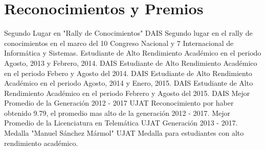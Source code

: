 \documentclass[]{friggeri-cv}
\begin{document}
\section{Reconocimientos y Premios}
\begin{entrylist}
          {Segundo Lugar en "Rally de Conocimientos"}
          {DAIS}
          {Segundo lugar en el rally de conocimientos en el marco del 10 Congreso Nacional y 7 Internacional de Informática y Sistemas.}
          {Estudiante de Alto Rendimiento Académico en el periodo Agosto, 2013 y Febrero, 2014.}
          {DAIS}
          {}
          {Estudiante de Alto Rendimiento Académico en el periodo Febero y Agosto del 2014.}
          {DAIS}
          {}
          {Estudiante de Alto Rendimiento Académico en el periodo Agosto, 2014 y Enero, 2015.}
          {DAIS}
          {}
          {Estudiante de Alto Rendimiento Académico en el periodo Febrero y Agosto del 2015.}
          {DAIS}
          {}
          {Mejor Promedio de la Generación 2012 - 2017}
          {UJAT}
          {Reconocimiento por haber obtenido 9.79, el promedio mas alto de la generación 2012 - 2017.}
          {Mejor Promedio de la Licenciatura en Telemática}
          {UJAT}
          {Generación 2013 - 2017.}
          {Medalla "Manuel Sánchez Mármol"}
          {UJAT}
          {Medalla para estudiantes con alto rendimiento académico.}
\end{entrylist}
\newline
\newline
\newline
\newline
\newline
\newline
\newline
\end{document}
